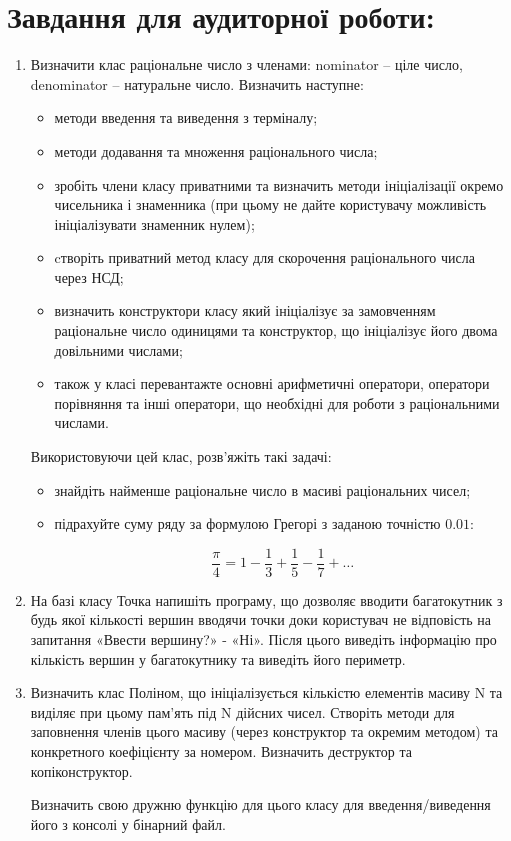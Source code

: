 \documentclass[a5paper,titlepage,openany,twoside,draft]{book_unv}%
\begin{document}
\section{Завдання для аудиторної роботи:}
\begin{enumerate}
\def\labelenumi{\arabic{enumi})}

\item 
Визначити клас раціональне число з членами: nominator -- ціле
число, denominator -- натуральне число. Визначить наступне:
\begin{itemize}
\item
методи введення та виведення з терміналу;
\item 
методи додавання та множення раціонального числа;
\item
зробіть члени класу приватними та визначить методи ініціалізації
окремо чисельника і знаменника (при цьому не дайте користувачу
можливість ініціалізувати знаменник нулем);
\item
cтворіть приватний метод класу для скорочення раціонального числа
через НСД;
\item визначить конструктори класу який ініціалізує за замовченням
раціональне число одиницями та конструктор, що ініціалізує його двома
довільними числами;
\item також у класі перевантажте основні арифметичні оператори, оператори
порівняння та інші оператори, що необхідні для роботи з раціональними
числами.
\end{itemize}

Використовуючи цей клас, розв'яжіть такі задачі:
\begin{itemize}
\item
знайдіть найменше раціональне число в масиві раціональних чисел;
\item
підрахуйте суму ряду за формулою Грегорі з заданою точністю $0.01$:

\[\frac{\pi}{4} = 1 - \frac{1}{3} + \frac{1}{5} - \frac{1}{7} + \ldots\]

\end{itemize}

\item
  На базі класу Точка напишіть програму, що дозволяє вводити
  багатокутник з будь якої кількості вершин вводячи точки доки
  користувач не відповість на запитання «Ввести вершину?» - «Ні». Після
  цього виведіть інформацію про кількість вершин у багатокутнику та
  виведіть його периметр.
\item
  Визначить клас Поліном, що ініціалізується кількістю елементів масиву
  N та виділяє при цьому пам'ять під N дійсних чисел. Створіть методи
  для заповнення членів цього масиву (через конструктор та окремим
  методом) та конкретного коефіцієнту за номером. Визначить деструктор
  та копіконструктор. 

  Визначить свою дружню функцію для цього класу для введення/виведення
його з консолі у бінарний файл.


\end{enumerate}
\end{document}

